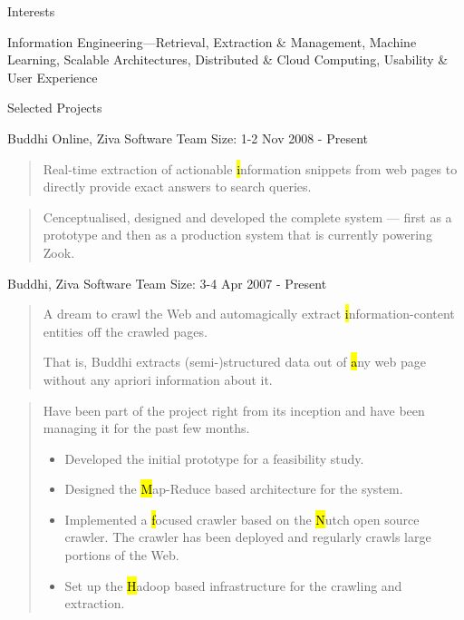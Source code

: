 \documentclass{resume}
\newcommand{\teamsize}{\hfill\sc\footnotesize Team Size: }
\begin{document}
\begin{category}{Interests}{}

    \item Information Engineering---Retrieval, Extraction \& Management,
        Machine Learning, Scalable Architectures, Distributed \& Cloud
        Computing, Usability \& User Experience

\end{category}


\begin{category}{Selected Projects}{}

    \item {\topic Buddhi Online,} Ziva Software
        {\teamsize 1-2}
        {\period Nov 2008 - Present}

        \begin{quote}
            Real-time extraction of actionable {\hl information snippets} from
            web pages to directly provide exact answers to search queries.
        \end{quote}

        \begin{quote}
            Cenceptualised, designed and developed the complete system ---
            first as a prototype and then as a production system that is
            currently powering Zook.
        \end{quote}

    \item {\topic Buddhi,} Ziva Software
        {\teamsize 3-4}
        {\period Apr 2007 - Present}

        \begin{quote}
            A dream to crawl the Web and automagically extract {\hl
            information-content entities} off the crawled pages.

            That is, Buddhi extracts (semi-)structured data out of {\hl
            any} web page without any apriori information about it.
        \end{quote}

        \begin{quote}
            Have been part of the project right from its inception and have
            been managing it for the past few months.
            \begin{itemize}
                \item Developed the initial prototype for a feasibility study.
                \item Designed the {\hl Map-Reduce} based architecture for the
                    system.
                \item Implemented a {\hl focused crawler} based on the {\hl
                    Nutch} open source crawler. The crawler has been deployed
                    and regularly crawls large portions of the Web.
                \item Set up the {\hl Hadoop} based infrastructure for the
                    crawling and extraction.
            \end{itemize}
        \end{quote}


\end{category}
\end{document}
